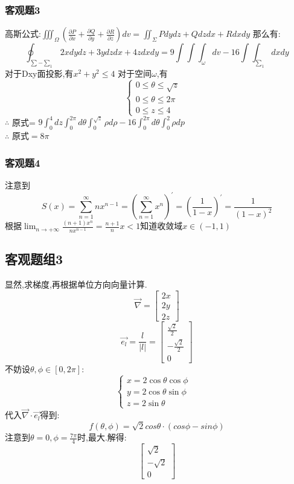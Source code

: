 \documentclass[a4paper,12pt]{ctexrep}
\begin{document}
\subsubsection{客观题3}
高斯公式:$\iiint_{\Omega}(\frac{\partial P}{\partial x}+\frac{\partial Q}{\partial y}+\frac{\partial R}{\partial z})dv=\iint_{\Sigma}Pdydz+Qdzdx+Rdxdy$
那么有:
$$\oint_{\sum-\sum_{1}}2xdydz+3ydzdx+4zdxdy=9\int\int\int_{\omega}dv-16\int\int_{\sum_{1}}dxdy$$
对于Dxy面投影,有$x^{2}+y^{2}\leq4$
对于空间$\omega$,有
$$\begin{cases}0\leq \theta\leq\sqrt{z}\\0\leq\theta\leq2\pi\\0\leq z\leq4&\end{cases}$$
$\therefore$ 原式= $9\int_{0}^{4}dz\int_{0}^{2\pi}d\theta\int_{0}^{\sqrt{z}}\rho d\rho-16\int_{0}^{2\pi}d\theta\int_{0}^{2}\rho dp$\\
$\therefore$ 原式$=8\pi$

\subsubsection{客观题4}
注意到$$S(x)=\sum_{n=1}^{\infty}nx^{n-1}=(\sum_{n=1}^{\infty}x^{n})^{\prime}=(\frac{1}{1-x})^{\prime}=\frac{1}{(1-x)^{2}}$$
根据$\lim_{n\to+\infty}\frac{(n+1)x^{n}}{nx^{n-1}}=\frac{n+1}{n}x<1$知道收敛域$x \in (-1,1)$

\newpage

\subsection{客观题组3}
显然,求梯度,再根据单位方向向量计算.
$$\overrightarrow{\nabla}=\begin{bmatrix}2x\\2y\\2z\end{bmatrix}$$
$$\overrightarrow{e_{l}}=\frac{l}{|l|}=\begin{bmatrix}\frac{\sqrt{2}}{2}\\-\frac{\sqrt{2}}{2}\\0\end{bmatrix}$$
不妨设$\theta,\phi \in [0,2\pi]$:
$$\begin{cases}x=2\cos\theta\cos \phi\\y=2\cos\theta\sin \phi\\z=2\sin\theta&\end{cases}$$
代入$\overrightarrow{\nabla}  \cdot \overrightarrow{e_{l}}$得到:
$$ f(\theta,\phi) = \sqrt{2} cos\theta\cdot (cos \phi - sin \phi )$$
注意到$ \theta = 0, \phi = \frac{7\pi}{4} $时,最大.解得:
$$\begin{bmatrix}\sqrt{2} \\ -\sqrt{2} \\0\end{bmatrix}$$
\end{document}

